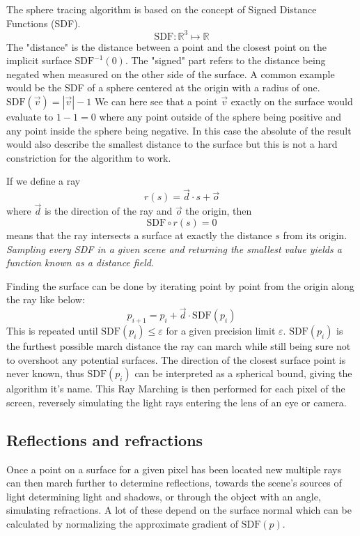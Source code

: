 		The sphere tracing algorithm is based on the concept of Signed Distance
		Functions (SDF).  $$\text{SDF}:\mathbb{R}^{3}\mapsto\mathbb{R}$$ The
		"distance" is the distance between a point and the closest point on the
		implicit surface $\text{SDF}^{-1}(0)$. 
		The "signed" part refers to the distance being negated when measured on the
		other side of the surface. A common example would be the SDF of a sphere
		centered at the origin with a radius of one. $\text{SDF}(\vec{v}) =
		|\vec{v}| - 1$ We can here see that a point $\vec{v}$ exactly on the
		surface would evaluate to $1 - 1 = 0$  where any point outside of the
		sphere being positive and any point inside the sphere being negative. In
		this case the absolute of the result would also describe the smallest
		distance to the surface but this is not a hard constriction for the
		algorithm to work.
		
		If we define a ray $$r(s) = \vec{d} \cdot s + \vec{o}$$
		where $\vec{d}$ is the direction of the ray and $\vec{o}$ the origin, then
		$$\text{SDF}\circ r(s) = 0$$ means that the ray intersects a surface at
		exactly the distance $s$ from its origin.  \emph{ Sampling every SDF in a
		given scene and returning the smallest value yields a function known as a
		distance field.  }

		\bigskip
		\noindent Finding the surface can be done by iterating point by point from the
		origin along the ray like below: $$p_{i+1} = p_i + \vec{d}\cdot
		\text{SDF}(p_i)$$ This is repeated until $\text{SDF}(p_i) \leq
		\varepsilon$ for a given precision limit $\varepsilon$.
		$\text{SDF}(p_i)$ is the furthest possible march distance the ray can 
		march while still being sure not to overshoot any potential surfaces.  
		The direction of the closest surface point is never known, thus 
		$\text{SDF}(p_i)$ can be interpreted as a spherical bound, giving the 
		algorithm it's name. This Ray Marching is then performed for each pixel 
		of the screen, reversely simulating the light rays entering the lens of 
		an eye or camera.
			
			\subsection{Reflections and refractions}
		
				Once a point on a surface for a given pixel has been located
				new multiple rays can then march further to determine
				reflections, towards the scene's sources of light determining
				light and shadows, or through the object with an angle,
				simulating refractions. A lot of these depend on the surface
				normal which can be calculated by normalizing the approximate
				gradient of $\text{SDF}(p)$. 
		
